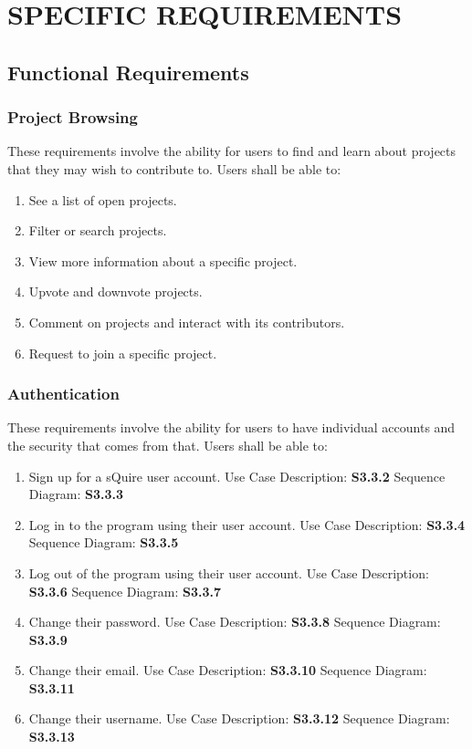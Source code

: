 \documentclass[twoside,letterpaper]{article}
\begin{document}
\clearpage\section[SPECIFIC REQUIREMENTS]{\rmfamily\bfseries\color{black} SPECIFIC REQUIREMENTS}
\hypertarget{RefHeading20459017292}{}{\color{black}

\subsection{Functional Requirements}

\subsubsection{Project Browsing}

These requirements involve the ability for users to find and learn about projects that they may wish to contribute to. Users shall be able to:

\begin{enumerate}
	\item See a list of open projects.
	\item Filter or search projects.
	\item View more information about a specific project.
	\item Upvote and downvote projects.
	\item Comment on projects and interact with its contributors.
	\item Request to join a specific project.
\end{enumerate}

\subsubsection{Authentication}

These requirements involve the ability for users to have individual accounts and the security that comes from that. Users shall be able to:

\begin{enumerate}
	\item Sign up for a sQuire user account.
		\subitem Use Case Description: \textbf{S3.3.2}
		\subitem Sequence Diagram: \textbf{S3.3.3}
	\item Log in to the program using their user account.
		\subitem Use Case Description: \textbf{S3.3.4}
		\subitem Sequence Diagram: \textbf{S3.3.5}
	\item Log out of the program using their user account.
		\subitem Use Case Description: \textbf{S3.3.6}
		\subitem Sequence Diagram: \textbf{S3.3.7}
	\item Change their password.
		\subitem Use Case Description: \textbf{S3.3.8}
		\subitem Sequence Diagram: \textbf{S3.3.9}
	\item Change their email.
		\subitem Use Case Description: \textbf{S3.3.10}
		\subitem Sequence Diagram: \textbf{S3.3.11}
	\item Change their username.
		\subitem Use Case Description: \textbf{S3.3.12}
		\subitem Sequence Diagram: \textbf{S3.3.13}
\end{enumerate}

}
\end{document}

